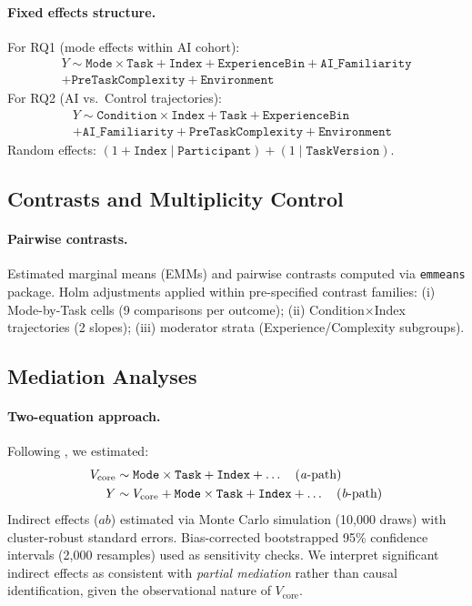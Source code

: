 \documentclass[sigconf]{acmart}
\begin{document}
\paragraph{Fixed effects structure.}
For RQ1 (mode effects within AI cohort):
\[
\begin{aligned}
Y \sim \texttt{Mode} \times \texttt{Task} + \texttt{Index} + \texttt{ExperienceBin} + \texttt{AI\_Familiarity} \\ + \texttt{PreTaskComplexity} + \texttt{Environment} \qquad\qquad\qquad\qquad\quad
\end{aligned}
\]
For RQ2 (AI vs.\ Control trajectories):
\[
\begin{aligned}
Y \sim \texttt{Condition} \times \texttt{Index} + \texttt{Task} + \texttt{ExperienceBin}\qquad\qquad \\ + \texttt{AI\_Familiarity} + \texttt{PreTaskComplexity} + \texttt{Environment}
\end{aligned}
\]
Random effects: \((1 + \texttt{Index} \mid \texttt{Participant}) + (1 \mid \texttt{TaskVersion})\).

\subsection{Contrasts and Multiplicity Control}

\paragraph{Pairwise contrasts.}
Estimated marginal means (EMMs) and pairwise contrasts computed via \texttt{emmeans} package. Holm adjustments applied within pre-specified contrast families: (i) Mode-by-Task cells (9 comparisons per outcome); (ii) Condition\(\times\)Index trajectories (2 slopes); (iii) moderator strata (Experience/Complexity subgroups).

\subsection{Mediation Analyses}

\paragraph{Two-equation approach.}
Following \citet{hayes2013mediation}, we estimated:
\begin{align*}
V_{\text{core}} &\sim \texttt{Mode} \times \texttt{Task} + \texttt{Index} + \ldots \quad (\text{\emph{a}-path}) \\
Y &\sim V_{\text{core}} + \texttt{Mode} \times \texttt{Task} + \texttt{Index} + \ldots \quad (\text{\emph{b}-path})
\end{align*}
Indirect effects (\(ab\)) estimated via Monte Carlo simulation (10{,}000 draws) with cluster-robust standard errors. Bias-corrected bootstrapped 95\% confidence intervals (2{,}000 resamples) used as sensitivity checks. We interpret significant indirect effects as consistent with \emph{partial mediation} rather than causal identification, given the observational nature of \(V_{\text{core}}\).
\end{document}

